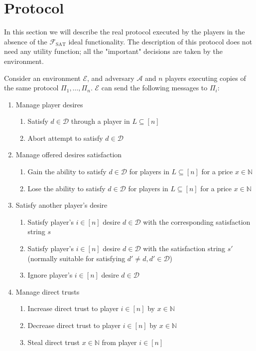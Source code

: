 \section{Protocol}
  In this section we will describe the real protocol executed by the players in the
  absence of the $\mathcal{F}_{\mathrm{SAT}}$ ideal functionality. The description of this
  protocol does not need any utility function; all the "important" decisions are taken by
  the environment.

  Consider an environment $\mathcal{E}$, and adversary $\mathcal{A}$ and $n$ players
  executing copies of the same protocol $\Pi_1, \dots, \Pi_n$. $\mathcal{E}$ can send the
  following messages to $\Pi_i$:
  \begin{enumerate}
    \item \label{msg:env:desires} Manage player desires
    \begin{enumerate}
      \item \label{msg:env:desires:create} Satisfy $d \in \mathcal{D}$ through a player in
      $L \subseteq \left[n\right]$
      \item \label{msg:env:desires:abort} Abort attempt to satisfy $d \in \mathcal{D}$
    \end{enumerate}
    \item Manage offered desires satisfaction
    \begin{enumerate}
      \item Gain the ability to satisfy $d \in \mathcal{D}$ for players in $L \subseteq
      \left[n\right]$ for a price $x \in \mathbb{N}$
      \item Lose the ability to satisfy $d \in \mathcal{D}$ for players in $L \subseteq
      \left[n\right]$ for a price $x \in \mathbb{N}$
    \end{enumerate}
    \item Satisfy another player's desire
    \begin{enumerate}
      \item Satisfy player's $i \in \left[n\right]$ desire $d \in \mathcal{D}$ with the
      corresponding satisfaction string $s$
      \item Satisfy player's $i \in \left[n\right]$ desire $d \in \mathcal{D}$ with the
      satisfaction string $s'$ (normally suitable for satisfying $d' \neq d, d' \in
      \mathcal{D}$)
      \item Ignore player's $i \in \left[n\right]$ desire $d \in \mathcal{D}$
    \end{enumerate}
    \item Manage direct trusts
    \begin{enumerate}
      \item Increase direct trust to player $i \in \left[n\right]$ by $x \in \mathbb{N}$
      \item Decrease direct trust to player $i \in \left[n\right]$ by $x \in \mathbb{N}$
      \item Steal direct trust $x \in \mathbb{N}$ from player $i \in \left[n\right]$
    \end{enumerate}
  \end{enumerate}
